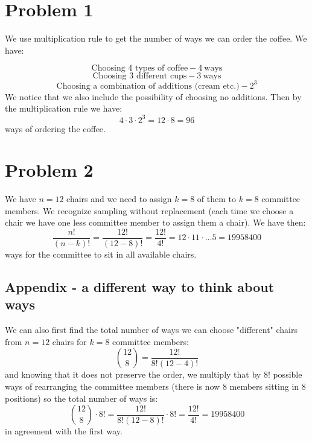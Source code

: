 \documentclass{article}
\begin{document}
\section*{Problem 1}

We use multiplication rule to get the number of ways we can order the coffee.
We have:

\begin{equation*}
    \mbox{Choosing 4 types of coffee} - 4 \ \mbox{ways}
\end{equation*}
\begin{equation*}
    \mbox{Choosing 3 different cups} - 3 \ \mbox{ways}
\end{equation*}
\begin{equation*}
    \mbox{Choosing a combination of additions (cream etc.)} - 2^{3}
\end{equation*}
We notice that we also include the possibility of choosing no additions.
Then by the multiplication rule we have:
\begin{equation*}
    4 \cdot 3 \cdot 2^{3} = 12 \cdot 8 = 96
\end{equation*}
ways of ordering the coffee.

\section*{Problem 2}
We have \(n=12\) chairs and we need to assign \(k=8\) of them to \(k=8\) committee
members. We recognize sampling without replacement (each time we choose a chair
we have one less committee member to assign them a chair). We have then:
\begin{equation*}
    \frac{n!}{(n-k)!} = \frac{12!}{(12-8)!} = \frac{12!}{4!} = 12 \cdot 11 \cdot \dots 5 = 19958400
\end{equation*}
ways for the committee to sit in all available chairs.


\subsection*{Appendix - a different way to think about ways}
We can also first find the total number of ways we can choose
"different" chairs from \(n=12\) chairs for \(k=8\) committee members:
\begin{equation*}
    \binom{12}{8} = \frac{12!}{8!(12 - 4)!}
\end{equation*}
and knowing that it does not preserve the order, we multiply that
by \(8!\) possible ways of rearranging the committee members (there is 
now \(8\) members sitting in \(8\) positions) so the total number of ways is:
\begin{equation*}
    \binom{12}{8} \cdot 8! = \frac{12!}{8!(12 - 8)!} \cdot 8! = \frac{12!}{4!} = 19958400
\end{equation*}
in agreement with the first way.
\end{document}
